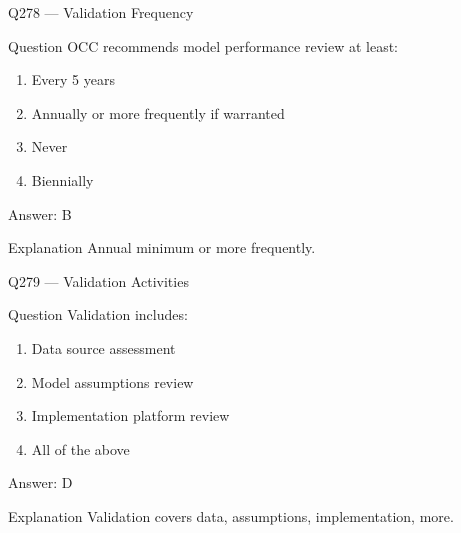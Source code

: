 \documentclass[aspectratio=169,8pt]{beamer}
\begin{document}
								\begin{frame}{Q278 --- Validation Frequency}
									\begin{block}{Question}
										OCC recommends model performance review at least:
										\begin{enumerate}
											\item Every 5 years
											\item Annually or more frequently if warranted
											\item Never
											\item Biennially
										\end{enumerate}
									\end{block}
									\begin{exampleblock}{Answer: B}\end{exampleblock}
									\begin{block}{Explanation}
										Annual minimum or more frequently.
									\end{block}
								\end{frame}
								
								\begin{frame}{Q279 --- Validation Activities}
									\begin{block}{Question}
										Validation includes:
										\begin{enumerate}
											\item Data source assessment
											\item Model assumptions review
											\item Implementation platform review
											\item All of the above
										\end{enumerate}
									\end{block}
									\begin{exampleblock}{Answer: D}\end{exampleblock}
									\begin{block}{Explanation}
										Validation covers data, assumptions, implementation, more.
									\end{block}
								\end{frame}
								
\end{document}

